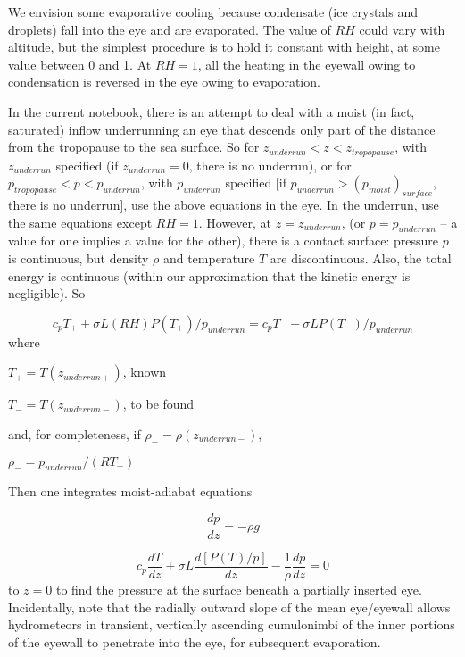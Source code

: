 \documentclass[preprint, prX]{revtex4}
\newcommand{\dd}[2]{\frac{d#1}{d#2}}
\begin{document}
We envision some evaporative cooling because condensate (ice crystals and droplets) fall into the eye and are evaporated. The value of $RH$ could vary with altitude, but the simplest procedure is to hold it constant with height, at some value between 0 and 1. At $RH=1$, all the heating in the eyewall owing to condensation is reversed in the eye owing to evaporation.

In the current notebook, there is an attempt to deal with a moist (in fact, saturated) inflow underrunning an eye that descends only part of the distance from the tropopause to the sea surface. So for $z_{underrun} < z < z_{tropopause}$, with $z_{underrun}$ specified (if $z_{underrun}=0$, there is no underrun), or for $p_{tropopause} < p < p_{underrun}$, with $p_{underrun}$ specified [if $p_{underrun} > (p_{moist})_{surface}$, there is no underrun], use the above equations in the eye. In the underrun, use the same equations except $RH=1$. However, at $z=z_{underrun}$, (or $p=p_{underrun}$ -- a value for one implies a value for the other), there is a contact surface: pressure $p$ is continuous, but density $\rho$ and temperature $T$ are discontinuous. Also, the total energy is continuous (within our approximation that the kinetic energy is negligible). So

\begin{equation}
	c_p T_+ + \sigma L (RH) P(T_+) / p_{underrun} = c_p T_- + \sigma L P(T_-) / p_{underrun}
\end{equation}
where

$T_+ = T(z_{underrun+})$, known

$T_- = T(z_{underrun-})$, to be found

\noindent and, for completeness, if $\rho_- = \rho(z_{underrun-})$,

$\rho_- = p_{underrun} / (RT_-)$

Then one integrates moist-adiabat equations

\begin{equation}
	\dd{p}{z} = -\rho g
\end{equation}

\begin{equation}
	c_p \dd{T}{z} + \sigma L \dd{[P(T)/p]}{z} - \frac{1}{\rho}\dd{p}{z} = 0
\end{equation}
to $z=0$ to find the pressure at the surface beneath a partially inserted eye. Incidentally, note that the radially outward slope of the mean eye/eyewall allows hydrometeors in transient, vertically ascending cumulonimbi of the inner portions of the eyewall to penetrate into the eye, for subsequent evaporation.
\end{document}
